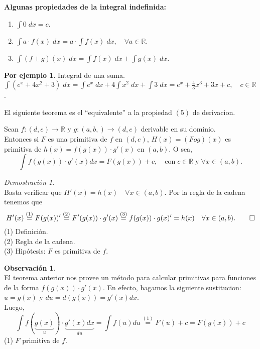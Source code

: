 \documentclass{article}
\theoremstyle{definition}
\newtheorem*{obs}{Observación}
\newtheorem*{ej}{Por ejemplo}
\theoremstyle{remark}
\newtheorem*{demo}{Demostración}
\newcommand\R{\ensuremath{\mathbb{R}}}
\begin{document}
\begin{center}
\textbf{Algunas propiedades de la integral indefinida:}
\end{center}

\begin{enumerate}
  \item $\int{0\;dx}=c$.
  \item $\int{a\cdot f(x)\;dx=a\cdot \int{f(x)\;dx}},\quad \forall a \in \R $.
  \item $\int{(f\pm g)(x)\;dx=\int{f(x)\;dx\pm \int{g(x)\;dx}}}$.
\end{enumerate}

\begin{ej} Integral de una suma. \\
  $\int{(e^x+4x^2+3)\;dx}=\int{e^x\;dx}+4\int{x^2\;dx}+\int{3\;dx}=e^x+\frac{4}{3}x^3+3x+c,\quad c \in \R$.
\end{ej}

El siguiente teorema es el ``equivalente'' a la propiedad $(5)$ de derivacion.
\pagebreak
\begin{teo}$\;$  \\
Sean $f:(d,e)\to \R$ y $g:(a,b,)\to(d,e)$ derivable en su dominio.\\ Entonces si $F$ es una primitiva de $f$ en $(d,e)$, $H(x)=(Fog)(x)$ es primitiva de $h(x)=f(g(x))\cdot g'(x)$ en $(a,b)$. O sea,
\[
\int{f(g(x)) \cdot g'(x)dx}=F(g(x))+c,\quad \text{con}\; c\in\R \;\text{y}\; \forall x \in (a,b).
\]
\end{teo}

\begin{demo} \; \\
  Basta verificar que $H'(x)=h(x)\quad \forall x \in (a,b)$. Por la regla de la cadena tenemos que \[
  H'(x)\overset{(1)}{=}F(g(x))'\overset{(2)}{=}F'(g(x))\cdot g'(x) \overset{(3)}{=} f(g(x)) \cdot g(x)' = h(x) \quad \forall x \in (a,b). \qed \]
(1) Definición.   \\
(2) Regla de la cadena.   \\
(3) Hipótesis: $F$ es primitiva de $f$.
\end{demo}

\begin{obs} \; \\
  El teorema anterior nos provee un método para calcular primitivas para funciones de la forma $f(g(x))\cdot g'(x)$. En efecto, hagamos la siguiente sustitucion: $u=g(x)$ y $ du=d(g(x))=g'(x)dx$.\\
  Luego, \[
  \int{f(\underbrace{g(x)}_{u})\cdot \underbrace{g'(x)dx}_{du}}=\int{f(u)du}\overset{(1)}{=}F(u)+c=F(g(x))+c
\]
(1) $F$ primitiva de $f$.
\end{obs}
\end{document}
